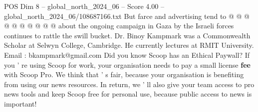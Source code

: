 \begin{textsample}{POS Dim 8 – global\_north\_2024\_06 – Score 4.00 – global\_north\_2024\_06/108687166.txt}
But farce and advertising tend to @ @ @ @ @ @ @ @ @ @ about the ongoing campaign in Gaza by the Israeli forces continues to rattle the swill bucket.
Dr.
Binoy Kampmark was a Commonwealth Scholar at Selwyn College, Cambridge.
He currently lectures at RMIT University.
Email : bkampmark@gmail.com Did you know Scoop has an Ethical Paywall?
If you ' re using Scoop for work, your organisation needs to pay a small license \textbf{fee} with Scoop Pro.
We think that ' s fair, because your organisation is benefiting from using our news resources.
In return, we ' ll also give your team access to pro news tools and keep Scoop free for personal use, because public access to news is important!

\end{textsample}
